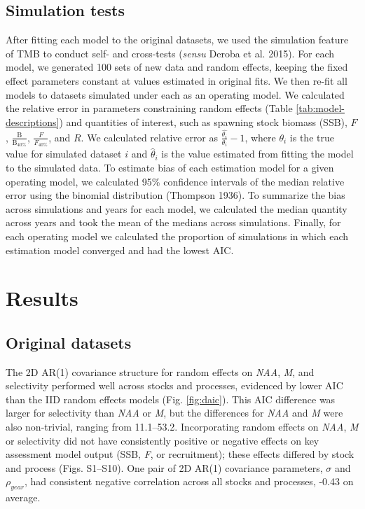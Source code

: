\documentclass[]{article}
\begin{document}
\hypertarget{simulation-tests}{%
\subsection{Simulation tests}\label{simulation-tests}}

After fitting each model to the original datasets, we used the
simulation feature of TMB to conduct self- and cross-tests (\emph{sensu}
Deroba et al. 2015). For each model, we generated 100 sets of new data
and random effects, keeping the fixed effect parameters constant at
values estimated in original fits. We then re-fit all models to datasets
simulated under each as an operating model. We calculated the relative
error in parameters constraining random effects (Table
\ref{tab:model-descriptions}) and quantities of interest, such as
spawning stock biomass (SSB), \(F\),
\(\frac{\text{B}}{\text{B}_{40\%}}\), \(\frac{F}{F_{40\%}}\), and \(R\).
We calculated relative error as \(\frac{\hat{\theta_i}}{\theta_i}-1\),
where \(\theta_i\) is the true value for simulated dataset \(i\) and
\(\hat{\theta}_i\) is the value estimated from fitting the model to the
simulated data. To estimate bias of each estimation model for a given
operating model, we calculated 95\% confidence intervals of the median
relative error using the binomial distribution (Thompson 1936). To
summarize the bias across simulations and years for each model, we
calculated the median quantity across years and took the mean of the
medians across simulations. Finally, for each operating model we
calculated the proportion of simulations in which each estimation model
converged and had the lowest AIC.

\hypertarget{results}{%
\section{Results}\label{results}}

\hypertarget{original-datasets}{%
\subsection{Original datasets}\label{original-datasets}}

The 2D AR(1) covariance structure for random effects on \emph{NAA},
\emph{M}, and selectivity performed well across stocks and processes,
evidenced by lower AIC than the IID random effects models (Fig.
\ref{fig:daic}). This AIC difference was larger for selectivity than
\emph{NAA} or \emph{M}, but the differences for \emph{NAA} and \emph{M}
were also non-trivial, ranging from 11.1--53.2. Incorporating random
effects on \emph{NAA}, \emph{M} or selectivity did not have consistently
positive or negative effects on key assessment model output (SSB,
\emph{F}, or recruitment); these effects differed by stock and process
(Figs. S1--S10). One pair of 2D AR(1) covariance parameters, \(\sigma\)
and \(\rho_{year}\), had consistent negative correlation across all
stocks and processes, -0.43 on average.
\end{document}
